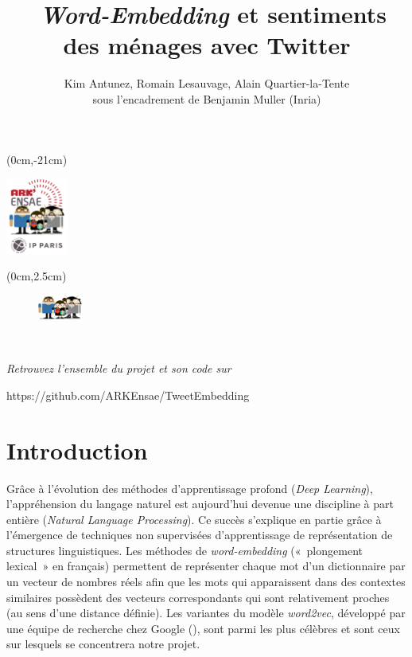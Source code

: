 \documentclass[11pt,french,french]{article}
\title{~\emph{Word-Embedding} et sentiments des ménages avec Twitter}
\author{Kim Antunez, Romain Lesauvage, Alain Quartier-la-Tente\\
sous l'encadrement de Benjamin Muller (Inria)}
\date{}
\begin{document}
\maketitle


{
\hypersetup{linkcolor=black}
\setcounter{tocdepth}{2}
\tableofcontents
}
\begin{textblock*}{\textwidth}(0cm,-21cm)
\begin{center}
\includegraphics[height=2.5cm]{img/LOGO-ENSAE.png}
\end{center}
\end{textblock*}

\begin{textblock*}{\textwidth}(0cm,2.5cm)
\begin{center}
\begin{minipage}{0.7\textwidth}

\begin{figure}
\includegraphics[height=0.8cm]{img/avatars.png}
\end{figure}

$\phantom{saut}$

\emph{Retrouvez l'ensemble du projet et son code sur}

https://github.com/ARKEnsae/TweetEmbedding

\end{minipage}
\end{center}

\end{textblock*}

\newpage 

\section*{Introduction}\label{introduction}

Grâce à l'évolution des méthodes d'apprentissage profond (\emph{Deep
Learning}), l'appréhension du langage naturel est aujourd'hui devenue
une discipline à part entière (\emph{Natural Language Processing}). Ce
succès s'explique en partie grâce à l'émergence de techniques non
supervisées d'apprentissage de représentation de structures
linguistiques. Les méthodes de \emph{word-embedding} («~plongement
lexical~» en français) permettent de représenter chaque mot d'un
dictionnaire par un vecteur de nombres réels afin que les mots qui
apparaissent dans des contextes similaires possèdent des vecteurs
correspondants qui sont relativement proches (au sens d'une distance
définie). Les variantes du modèle \emph{word2vec}, développé par une
équipe de recherche chez Google (\cite{Mikolov}), sont parmi les plus
célèbres et sont ceux sur lesquels se concentrera notre projet.
\end{document}
